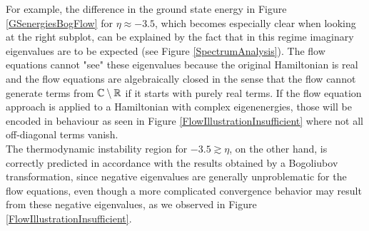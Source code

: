 For example, the difference in the ground state energy in Figure \ref{GSenergiesBogFlow} for $\eta\approx -3.5$, which becomes especially clear when looking at the right subplot, can be explained by the fact that in this regime imaginary eigenvalues are to be expected (see Figure \ref{SpectrumAnalysis}). The flow equations cannot "see" these eigenvalues because the original Hamiltonian is real and the flow equations are algebraically closed in the sense that the flow cannot generate terms from $\mathbb{C}\setminus \mathbb{R}$ if it starts with purely real terms. If the flow equation approach is applied to a Hamiltonian with complex eigenenergies, those will be encoded in behaviour as seen in Figure \ref{FlowIllustrationInsufficient} where not all off-diagonal terms vanish. \\
The thermodynamic instability region for $-3.5\gtrsim\eta$, on the other hand, is correctly predicted in accordance with the results obtained by a Bogoliubov transformation, since negative eigenvalues are generally unproblematic for the flow equations, even though a more complicated convergence behavior may result from these negative eigenvalues, as we observed in Figure \ref{FlowIllustrationInsufficient}.

